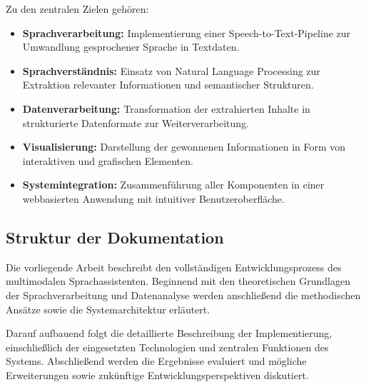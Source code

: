 Zu den zentralen Zielen gehören:
\begin{itemize}
\item \textbf{Sprachverarbeitung:} Implementierung einer Speech-to-Text-Pipeline zur Umwandlung gesprochener Sprache in Textdaten.
\item \textbf{Sprachverständnis:} Einsatz von Natural Language Processing zur Extraktion relevanter Informationen und semantischer Strukturen.
\item \textbf{Datenverarbeitung:} Transformation der extrahierten Inhalte in strukturierte Datenformate zur Weiterverarbeitung.
\item \textbf{Visualisierung:} Darstellung der gewonnenen Informationen in Form von interaktiven und grafischen Elementen.
\item \textbf{Systemintegration:} Zusammenführung aller Komponenten in einer webbasierten Anwendung mit intuitiver Benutzeroberfläche.
\end{itemize}

\subsection{Struktur der Dokumentation}
Die vorliegende Arbeit beschreibt den vollständigen Entwicklungsprozess des multimodalen Sprachassistenten. Beginnend mit den theoretischen Grundlagen der Sprachverarbeitung und Datenanalyse werden anschließend die methodischen Ansätze sowie die Systemarchitektur erläutert.

Darauf aufbauend folgt die detaillierte Beschreibung der Implementierung, einschließlich der eingesetzten Technologien und zentralen Funktionen des Systems. Abschließend werden die Ergebnisse evaluiert und mögliche Erweiterungen sowie zukünftige Entwicklungsperspektiven diskutiert.
